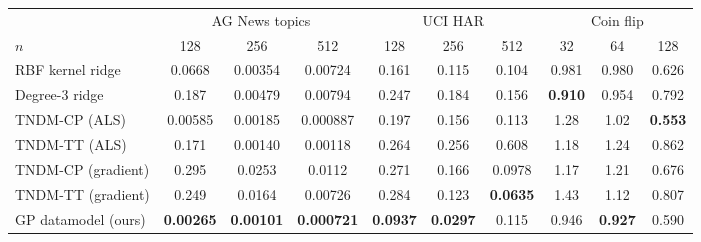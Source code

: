 \begin{tabular}{@{}lccccccccc@{}}
\toprule
& \multicolumn{3}{c}{AG News topics} & \multicolumn{3}{c}{UCI HAR} & \multicolumn{3}{c}{Coin flip} \\
\cmidrule(lr){2-4}\cmidrule(lr){5-7}\cmidrule(lr){8-10}
$n$ & 128 & 256 & 512 & 128 & 256 & 512 & 32 & 64 & 128 \\
\midrule
RBF kernel ridge & 0.0668 & 0.00354 & 0.00724 & 0.161 & 0.115 & 0.104 & 0.981 & 0.980 & 0.626 \\
Degree-3 ridge & 0.187 & 0.00479 & 0.00794 & 0.247 & 0.184 & 0.156 & \textbf{0.910} & 0.954 & 0.792 \\
TNDM-CP (ALS) & 0.00585 & 0.00185 & 0.000887 & 0.197 & 0.156 & 0.113 & 1.28 & 1.02 & \textbf{0.553} \\
TNDM-TT (ALS) & 0.171 & 0.00140 & 0.00118 & 0.264 & 0.256 & 0.608 & 1.18 & 1.24 & 0.862 \\
TNDM-CP (gradient) & 0.295 & 0.0253 & 0.0112 & 0.271 & 0.166 & 0.0978 & 1.17 & 1.21 & 0.676 \\
TNDM-TT (gradient) & 0.249 & 0.0164 & 0.00726 & 0.284 & 0.123 & \textbf{0.0635} & 1.43 & 1.12 & 0.807 \\
GP datamodel (ours) & \textbf{0.00265} & \textbf{0.00101} & \textbf{0.000721} & \textbf{0.0937} & \textbf{0.0297} & 0.115 & 0.946 & \textbf{0.927} & 0.590 \\
\bottomrule
\end{tabular}
